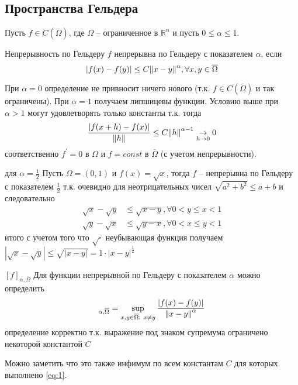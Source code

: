 \documentclass[12pt,a4paper]{article}
\newcommand{\Real}{\mathbb{R}}
\begin{document}
\subsection{Пространства Гельдера}
Пусть $f \in C(\overline{\Omega})$, где $\Omega$ -- ограниченное в $\Real^n$ и пусть $0 \leq \alpha \leq 1$.

\begin{definition}{Непрерывность по Гельдеру}{}
	$f$ непрерывна по Гельдеру с показателем $\alpha$, если
	\begin{equation}\label{eq:1}
		|f(x) - f(y)| \leq C\norm{x - y}^\alpha, \forall x,y \in \overline{\Omega}
	\end{equation}
\end{definition}
При $\alpha = 0$ определение не привносит ничего нового (т.к. $f \in C(\overline{\Omega})$ и так ограничены). При $\alpha = 1$ получаем липшицевы функции. Условию выше при $\alpha > 1$ могут удовлетворять только константы т.к. тогда
\begin{equation*}
	\frac{|f(x+h) - f(x)|}{\norm{h}} \leq C \norm{h}^{\alpha-1} \underset{h\to 0}{\to} 0
\end{equation*}
соответственно $f^\prime = 0$ в $\Omega$ и $f = const$ в $\overline{\Omega}$ (с учетом непрерывности).

\begin{example}{для $\alpha = \frac{1}{2}$}{}
	Пусть $\Omega = (0, 1)$ и $f(x) = \sqrt{x}$, тогда $f$ -- непрерывна по Гельдеру с показателем $\frac{1}{2}$ т.к. очевидно для неотрицательных чисел $\sqrt{a^2 + b^2} \leq a + b$ и следовательно
	\begin{align*}
		\sqrt{x} - \sqrt{y} &\leq \sqrt{x - y}, \forall 0 < y \leq x < 1 \\
		\sqrt{y} - \sqrt{x} &\leq \sqrt{y - x}, \forall 0 < x \leq y < 1
	\end{align*}
	итого с учетом того что $\sqrt{\cdot}$ неубывающая функция получаем \\ $|\sqrt{x} - \sqrt{y}| \leq \sqrt{|x-y|} = 1\cdot|x-y|^{\frac{1}{2}}$
\end{example}

\begin{definition}{$[f]_{\alpha, \overline{\Omega}}$}{}
	Для функции непрерывной по Гельдеру с показателем $\alpha$ можно определить
	\begin{equation*}
		[f]_{\alpha, \overline{\Omega}} = \sup\limits_{x, y \in \overline{\Omega}: \ x \neq y}{\frac{|f(x)-f(y)|}{\norm{x-y}^\alpha}}
	\end{equation*}
	определение корректно т.к. выражение под знаком супремума ограничено некоторой константой $C$
\end{definition}
Можно заметить что это также инфимум по всем константам $C$ для которых выполнено \eqref{eq:1}.
\end{document}
